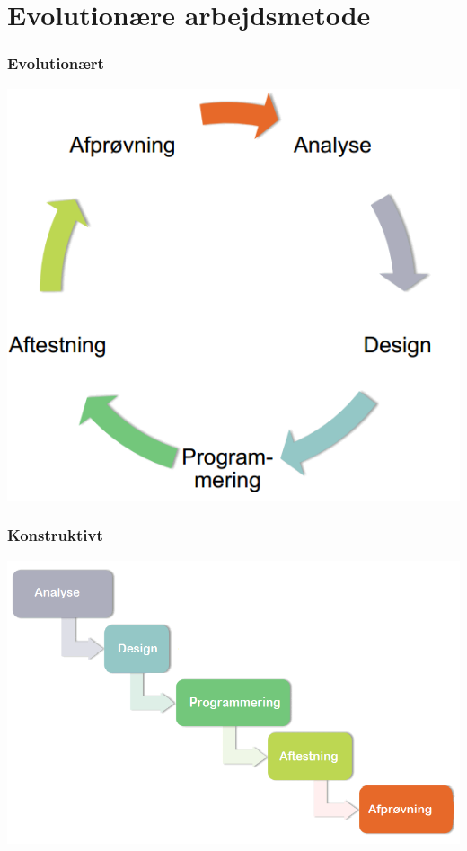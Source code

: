 \section{Evolutionære arbejdsmetode}
\begin{frame}
	\frametitle{Evolutionært}
	\begin{center}
	\includegraphics[scale=0.35]{../report/billeder/evolutionaeremetode.png}
	\end{center}
\end{frame}

\begin{frame}
	\frametitle{Konstruktivt}
	\begin{center}
	\includegraphics[scale=0.35]{../report/billeder/konstruktivemetode.png}
	\end{center}
	
\end{frame}

